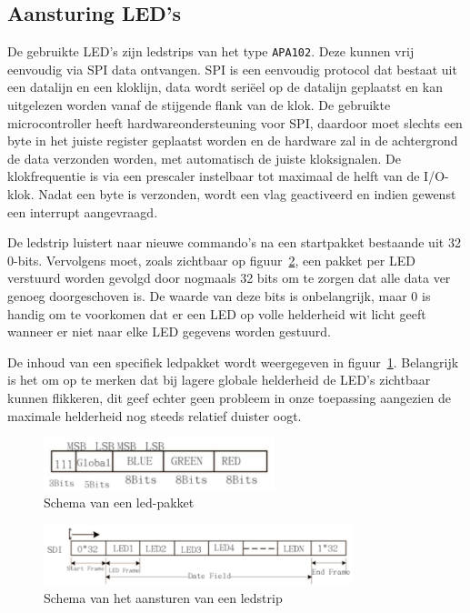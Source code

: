 \documentclass[12pt]{ugentreport}
\begin{document}
\subsection{Aansturing LED's}
De gebruikte LED's zijn ledstrips van het type \texttt{APA102}.
Deze kunnen vrij eenvoudig via SPI data ontvangen.
SPI is een eenvoudig protocol dat bestaat uit een datalijn en een kloklijn, data
wordt seriëel op de datalijn geplaatst en kan uitgelezen worden vanaf de
stijgende flank van de klok. De gebruikte microcontroller heeft
hardwareondersteuning voor SPI, daardoor moet slechts een byte in het juiste
register geplaatst worden en de hardware zal in de achtergrond de data verzonden
worden, met automatisch de juiste kloksignalen. De klokfrequentie is via een
prescaler instelbaar tot maximaal de helft van de I/O-klok. Nadat een byte is
verzonden, wordt een vlag geactiveerd en indien gewenst een interrupt aangevraagd.

De ledstrip luistert naar nieuwe commando's na een startpakket
bestaande uit 32 0-bits. Vervolgens moet,
zoals zichtbaar op figuur~\ref{fig:ledcontrol},
een pakket per LED verstuurd worden gevolgd door
nogmaals 32 bits om te zorgen dat alle data ver genoeg doorgeschoven is.
De waarde van deze bits is onbelangrijk,
maar 0 is handig om te voorkomen dat er een LED op volle helderheid wit licht
geeft wanneer er niet naar elke LED gegevens worden gestuurd.

De inhoud van een specifiek ledpakket wordt weergegeven in
figuur~\ref{fig:ledpakket}. Belangrijk is het om op te merken dat bij lagere
globale helderheid de LED's zichtbaar kunnen flikkeren, dit geef echter geen
probleem in onze toepassing aangezien de maximale helderheid nog steeds relatief
duister oogt.

\begin{figure}
  \centering
  \includegraphics[width=0.6\textwidth]{img/ledpakket.png}
  \caption{Schema van een led-pakket}
  \label{fig:ledpakket}
\end{figure}

\begin{figure}
  \centering
  \includegraphics[width=0.8\textwidth]{img/ledcontrol.png}
  \caption{Schema van het aansturen van een ledstrip}
  \label{fig:ledcontrol}
\end{figure}
\end{document}
